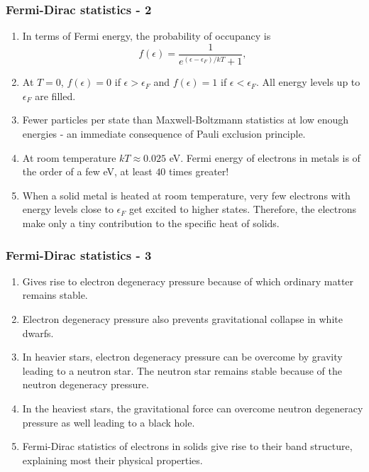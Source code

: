 \documentclass{beamer}
\begin{document}
\begin{frame}
\frametitle{Fermi-Dirac statistics - 2}
\begin{enumerate}
\item In terms of Fermi energy, the probability of occupancy is
\begin{equation}\label{e11}
f(\epsilon) = \frac{1}{e^{(\epsilon - \epsilon_F)/kT} + 1},
\end{equation}
\item At $T = 0$, $f(\epsilon) = 0$ if $\epsilon > \epsilon_F$ and $f(\epsilon)
= 1$ if $\epsilon < \epsilon_F$. All energy levels up to $\epsilon_F$ are 
filled.
\item Fewer particles per state than Maxwell-Boltzmann statistics at low enough
energies - an immediate consequence of Pauli exclusion principle.
\item At room temperature $kT \approx 0.025$ eV. Fermi energy of electrons in
metals is of the order of a few eV, at least $40$ times greater!
\item When a solid metal is heated at room temperature, very few electrons with
energy levels close to $\epsilon_F$ get excited to higher states. Therefore,
the electrons make only a tiny contribution to the specific heat of solids.
\end{enumerate}
\end{frame}

\begin{frame}
\frametitle{Fermi-Dirac statistics - 3}
\begin{enumerate}
\item Gives rise to electron degeneracy pressure because of which ordinary 
matter remains stable.
\item Electron degeneracy pressure also prevents gravitational collapse in 
white dwarfs.
\item In heavier stars, electron degeneracy pressure can be overcome by 
gravity leading to a neutron star. The neutron star remains stable because 
of the neutron degeneracy pressure.
\item In the heaviest stars, the gravitational force can overcome neutron
degeneracy pressure as well leading to a black hole.
\item Fermi-Dirac statistics of electrons in solids give rise to their band 
structure, explaining most their physical properties.
\end{enumerate}
\end{frame}
\end{document}
